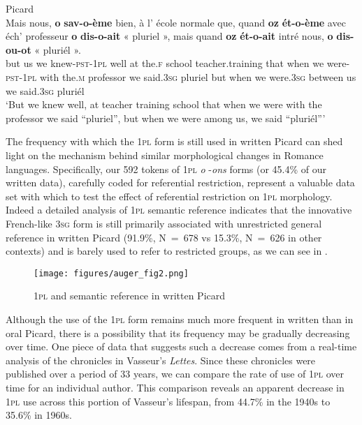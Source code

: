 \documentclass[output=paper,colorlinks,citecolor=brown]{langscibook}
\begin{document}
\ea \label{02:ex:8} Picard\\
\gll Mais nous, \textbf{o}   \textbf{sav-o-ème}     bien, à  l’       école   normale             que, quand \textbf{oz}   \textbf{ét-o-ème}       avec  éch’   professeur \textbf{o}     \textbf{dis-o-ait}  {« pluriel »}, mais quand \textbf{oz} \textbf{ét-o-ait}    intré       nous, \textbf{o}    \textbf{dis-ou-ot}  {« pluriél »}. \\
but    us     we knew-\textsc{pst}-1\textsc{pl} well  at the.\textsc{f} school teacher.training that  when we  were-\textsc{pst}-1\textsc{pl} with  the.\textsc{m}  professor   we  said.3\textsc{sg}   pluriel    but when we were.3\textsc{sg}  between us      we said.3\textsc{sg}    pluriél\\
\newpage
\glt ‘But we knew well, at teacher training school that when we were with the professor we said “pluriel”, but when we were among us, we said “pluriél”'
\z

	The frequency with which the 1\textsc{pl} form is still used in written Picard can shed light on the mechanism behind similar morphological changes in Romance languages. Specifically, our 592 tokens of 1\textsc{pl} \textit{o} -\textit{ons} forms (or 45.4\% of our written data), carefully coded for referential restriction, represent a valuable data set with which to test the effect of referential restriction on 1\textsc{pl} morphology. Indeed a detailed analysis of 1\textsc{pl} semantic reference indicates that the innovative French-like 3\textsc{sg} form is still primarily associated with unrestricted general reference  in written Picard (91.9\%, N~=~678 vs 15.3\%, N~=~626 in other contexts) and is barely used to refer to restricted groups, as we can see in .
\begin{figure}
    \centering
    \texttt{[image: figures/auger\_fig2.png]}
    \caption{1\textsc{pl} and semantic reference in written Picard}
    \label{02:Fig2}
\end{figure}

Although the use of the 1\textsc{pl} form remains much more frequent in written than in oral Picard, there is a possibility that its frequency may be gradually decreasing over time. One piece of data that suggests such a decrease comes from a real-time analysis of the chronicles in Vasseur’s \textit{Lettes}. Since these chronicles were published over a period of 33 years, we can compare the rate of use of 1\textsc{pl} over time for an individual author. This comparison reveals an apparent decrease in 1\textsc{pl} use across this portion of Vasseur’s lifespan, from 44.7\% in the 1940s to 35.6\% in 1960s.
\end{document}
